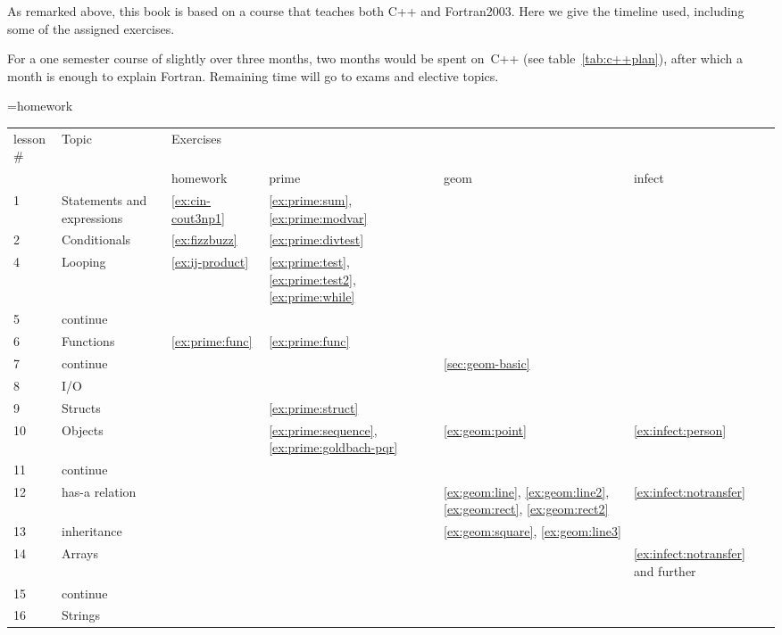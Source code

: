 As remarked above, this book is based on a course that teaches both
C++ and Fortran2003. Here we give the timeline used, including some of
the assigned exercises.

For a one semester course of slightly over three months, two months
would be spent on~C++ (see table~\ref{tab:c++plan}), after which a
month is enough to explain Fortran. Remaining time will go to exams
and elective topics.

\begin{table}[ht]
  =\hbox{homework }\edef\colwidth{\the\wd0}
  \begin{tabular}{|l|p{\colwidth}|p{\colwidth}p{\colwidth}p{\colwidth}p{\colwidth}|}
    \hline
    lesson$\#$&Topic&Exercises&&&\\
    &&homework&prime&geom&infect\\
    \hline
    1 & Statements and expressions
        &\ref{ex:cin-cout3np1}
        &\ref{ex:prime:sum}, \ref{ex:prime:modvar}&&\\
    2 & Conditionals
        &\ref{ex:fizzbuzz}&\ref{ex:prime:divtest}&&\\
    4 & Looping
        &\ref{ex:ij-product}
        &\ref{ex:prime:test}, \ref{ex:prime:test2}, \ref{ex:prime:while}&&\\
    5 & continue
        &&&&\\
    6 & Functions
        &\ref{ex:prime:func}&\ref{ex:prime:func}&&\\
    7 & continue
        &&&\ref{sec:geom-basic}&\\
    8 & I/O 
        &&&&\\
    9 & Structs
        &&\ref{ex:prime:struct}&&\\
    10 & Objects
        &&\ref{ex:prime:sequence}, \ref{ex:prime:goldbach-pqr}&
        \ref{ex:geom:point}&\ref{ex:infect:person}\\
    11 & continue
        &&&&\\
    12 & has-a relation
        &&&\ref{ex:geom:line}, \ref{ex:geom:line2},
        \ref{ex:geom:rect}, \ref{ex:geom:rect2}&\ref{ex:infect:notransfer}\\
    13 & inheritance
        &&&\ref{ex:geom:square}, \ref{ex:geom:line3}&\\
    14 & Arrays
        &&&&\ref{ex:infect:notransfer} and further\\
    15 & continue
        &&&&\\
    16 & Strings

\end{tabular}
\end{table}

